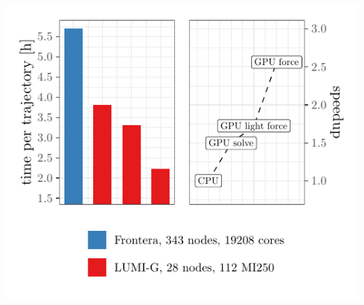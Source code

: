\documentclass[a0,portrait]{a0poster}
\begin{document}
\begin{multicols}{2}
\begin{minipage}{0.5\linewidth}
      \includegraphics[height=13.5cm,page=1]{data/tmLQCD_performance/quda_speedup}\\
    \end{minipage}


\end{multicols}
\end{document}

